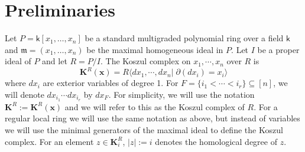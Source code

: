\documentclass[10pt,reqno]{amsart}
\theoremstyle{definition}
\theoremstyle{remark}
\numberwithin{equation}{section}
\newcommand{\kk}{\mathsf k}
\newcommand{\m}{\mathfrak m}
\numberwithin{equation}{section}
\begin{document}

\section{Preliminaries}
Let $P=\kk[x_1,\ldots,x_n]$ be a standard multigraded polynomial ring over a field $\kk$ and $\m=(x_1,\ldots,x_n)$ be the maximal homogeneous ideal in $P$. Let $I$ be a proper ideal of $P$ and let $R=P/I$.
The Koszul complex on $x_1,\cdots,x_n$ over $R$ is \[
\mathbf{K}^{R}(\mathbf{x})=R\langle dx_1,\cdots,dx_n|\;\partial(dx_i)=x_i\rangle
\]
where $dx_i$ are exterior variables of degree 1. For $F=\{i_1<\cdots<i_r\}\subseteq [n]$, we will denote $dx_{i_1}\cdots dx_{i_r}$ by $dx_F$. For simplicity, we will use the notation $\mathbf {K}^{R}:=\mathbf{K}^{R}(\mathbf{x})$ and we will refer to this as the Koszul complex of $R$. For a regular local ring we will use the same notation as above, but instead of variables we will use the minimal generators of the maximal ideal to define the Koszul complex. For an element $z\in \mathbf{K}_i^R$, $|z|:=i$ denotes the homological degree of $z$.
\end{document}

